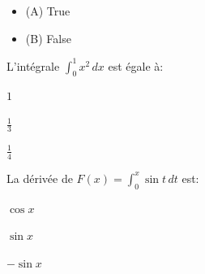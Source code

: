 \documentclass[12pt]{exam}
\begin{document}
\begin{questions}
\begin{itemize}[label={}]
  \item (A) True
  \item (B) False
\end{itemize}








\vspace{1em}





\question L'intégrale \( \int_0^1 x^2\,dx \) est égale à:



\begin{choices}

  
    \choice $1$
  

  
    \CorrectChoice $\tfrac{1}{3}$
  

  
    \choice $\tfrac{1}{4}$
  

\end{choices}









\vspace{1em}





\question La dérivée de \( F(x) = \int_0^x \sin t\,dt \) est:



\begin{choices}

  
    \choice $\cos x$
  

  
    \CorrectChoice $\sin x$
  

  
    \choice $-\sin x$
  

\end{choices}










\end{questions}
\end{document}
